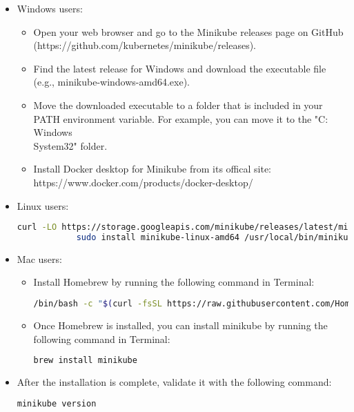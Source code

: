 \begin{itemize}
	\begin{itemize}
		\item Windows users:	
		\begin{itemize}
			\item Open your web browser and go to the Minikube releases page on GitHub (https://github.com/kubernetes/minikube/releases).
			\item Find the latest release for Windows and download the executable file (e.g., minikube-windows-amd64.exe).
			\item Move the downloaded executable to a folder that is included in your PATH environment variable. For example, you can move it to the "C:\\Windows\\System32" folder.
			\item Install Docker desktop for Minikube from its offical site: https://www.docker.com/products/docker-desktop/
		\end{itemize}
		\item Linux users:
		\begin{lstlisting}[language=bash]
			curl -LO https://storage.googleapis.com/minikube/releases/latest/minikube-linux-amd64
			sudo install minikube-linux-amd64 /usr/local/bin/minikube
		\end{lstlisting}
		\item Mac users:
		\begin{itemize}
			\item Install Homebrew by running the following command in Terminal:
			\begin{lstlisting}[language=bash]
				/bin/bash -c "$(curl -fsSL https://raw.githubusercontent.com/Homebrew/install/HEAD/install.sh)"
			\end{lstlisting}

			\item Once Homebrew is installed, you can install minikube by running the following command in Terminal:
			\begin{lstlisting}[language=bash]
				brew install minikube
			\end{lstlisting}
		\end{itemize}
		\item After the installation is complete, validate it with the following command:
		\begin{lstlisting}[language=bash]
			minikube version
		\end{lstlisting}	
	\end{itemize}


\end{itemize}
